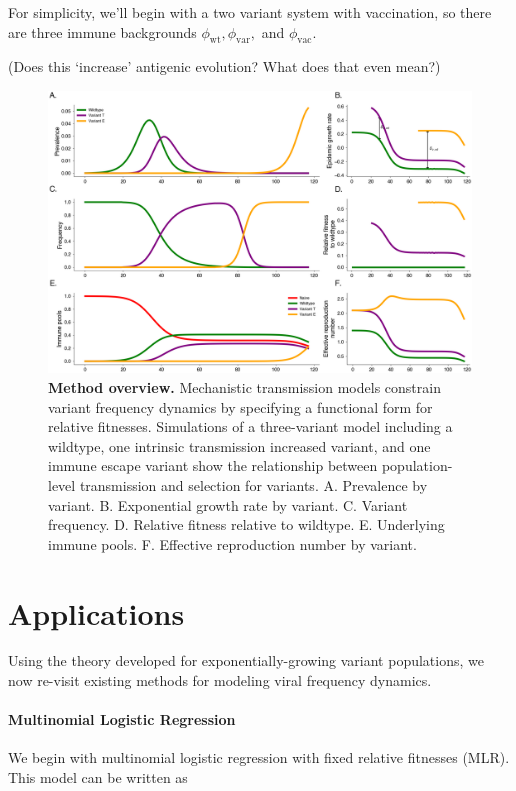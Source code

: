 \documentclass[12pt,oneside,letterpaper]{article}
\newcommand{\wt}{\text{wt}}
\newcommand{\var}{\text{var}}
\newcommand{\vac}{\text{vac}}
\begin{document}
For simplicity, we'll begin with a two variant system with vaccination, so there are three immune backgrounds $\phi_{\wt}, \phi_{\var},$ and $\phi_{\vac}$.

(Does this `increase' antigenic evolution? What does that even mean?)

\begin{figure}[h]
    \centering
    \includegraphics[width=0.8\linewidth]{./figures/vis_mechanisms.png}
    \caption{\textbf{Method overview.} 
    Mechanistic transmission models constrain variant frequency dynamics by specifying a functional form for relative fitnesses.
    Simulations of a three-variant model including a wildtype, one intrinsic transmission increased variant, and one immune escape variant show the relationship between population-level transmission and selection for variants.
    A. Prevalence by variant.
    B. Exponential growth rate by variant.
    C. Variant frequency.
    D. Relative fitness relative to wildtype.
    E. Underlying immune pools.
    F. Effective reproduction number by variant.
}%
    \label{fig:vis_mechanisms}
\end{figure}

\section*{Applications}

Using the theory developed for exponentially-growing variant populations, we now re-visit existing methods for modeling viral frequency dynamics.

\paragraph{Multinomial Logistic Regression}%

We begin with multinomial logistic regression with fixed relative fitnesses (MLR).
This model can be written as
\end{document}
